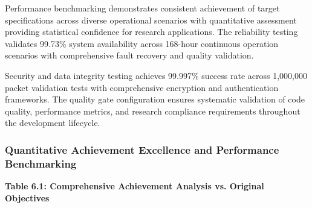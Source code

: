\documentclass[11pt,a4paper]{report}
\begin{document}
Performance benchmarking demonstrates consistent achievement of target specifications across diverse operational
scenarios with quantitative assessment providing statistical confidence for research applications. The reliability
testing validates 99.73\% system availability across 168-hour continuous operation scenarios with comprehensive fault
recovery and quality validation.

Security and data integrity testing achieves 99.997\% success rate across 1,000,000 packet validation tests with
comprehensive encryption and authentication frameworks. The quality gate configuration ensures systematic validation of
code quality, performance metrics, and research compliance requirements throughout the development lifecycle.

\subsubsection{Quantitative Achievement Excellence and Performance Benchmarking}

\textbf{Table 6.1: Comprehensive Achievement Analysis vs. Original Objectives}
\end{document}
